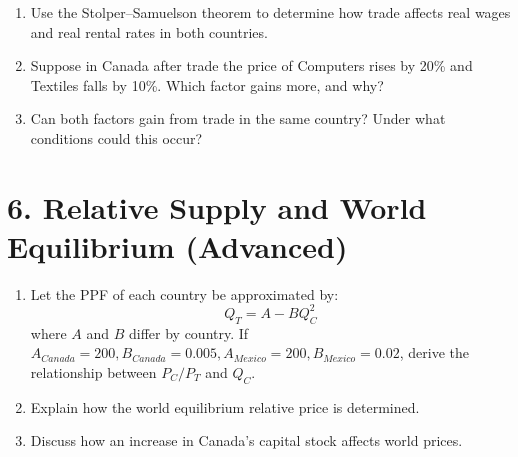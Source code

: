 \documentclass[12pt]{article}
\begin{document}
\begin{enumerate}
    \item Use the Stolper–Samuelson theorem to determine how trade affects real wages and real rental rates in both countries.
    \item Suppose in Canada after trade the price of Computers rises by 20\% and Textiles falls by 10\%. Which factor gains more, and why?
    \item Can both factors gain from trade in the same country? Under what conditions could this occur?
\end{enumerate}

\section*{6. Relative Supply and World Equilibrium (Advanced)}

\begin{enumerate}
    \item Let the PPF of each country be approximated by:
    \[
    Q_T = A - B Q_C^2
    \]
    where \(A\) and \(B\) differ by country.  
    If \(A_{Canada}=200, B_{Canada}=0.005, A_{Mexico}=200, B_{Mexico}=0.02\), derive the relationship between \(P_C/P_T\) and \(Q_C\).
    \item Explain how the world equilibrium relative price is determined.
    \item Discuss how an increase in Canada’s capital stock affects world prices.
\end{enumerate}
\end{document}
